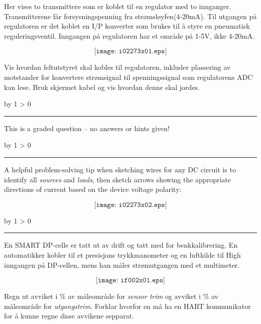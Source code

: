 \documentclass[12pt,a4paper]{article}
\def\oppgave{
            \advance\questnum by 1
            \ifnum \questnum > 0
                 \hrule
                 \vskip 3pt
                 \leftline{Oppgave \the\questnum}
                 \vskip 3pt \fi}
\def\svar{
           \advance\answnum by 1
           \ifnum \answnum > 0
                \hrule
                \vskip 3pt
                \leftline{Svar \the\answnum}
                \vskip 3pt \fi}
\def\notes{
           \advance\explnum by 1
           \ifnum \explnum > 0
                \hrule
                \vskip 3pt
                \leftline{Notes \the\explnum}
                \vskip 3pt \fi}
\begin{document}
Her vises to transmittere som er koblet til en regulator med to innganger. Transmitterene får forsysningspenning fra strømsløyfen(4-20mA). Til utgangen på regulatoren er det koblet en I/P konverter som brukes til å styre en pneumatisk reguleringsventil. Inngangen på regulatoren har et område på 1-5V, ikke 4-20mA. 

$$\texttt{[image: i02273x01.eps]}$$

Vis hvordan feltutstyret skal kobles til regulatoren, inkluder plassering av motstander for konvertere strømsignal til spenningssignal som regulatorens ADC kan lese. Bruk skjermet kabel og vis hvordan denne skal jordes. 


\vfil 

\eject
\vskip 10pt \filbreak 





\svar{} 

This is a graded question -- no answers or hints given!

\vskip 10pt \filbreak 





\notes{} 

A helpful problem-solving tip when sketching wires for any DC circuit is to identify all {\it sources} and {\it loads}, then sketch arrows showing the appropriate directions of current based on the device voltage polarity:

$$\texttt{[image: i02273x02.eps]}$$


\vfil \eject 




\oppgave{} 

En SMART DP-celle er tatt ut av drift og tatt med for benkkalibrering. En automatikker kobler til et presisjons trykkmanometer og en luftkilde til High inngangen på DP-cellen, mens han måler strømutgangen med et multimeter. 

$$\texttt{[image: if002x01.eps]}$$

Regn ut avviket i \% av måleområde for {\it sensor trim} og avviket i  \% av måleområde for {\it utgangstrim}.  Forklar hvorfor en må ha en HART kommunikator for å kunne regne disse avvikene sepparat. 
\eject
{}
\end{document}
